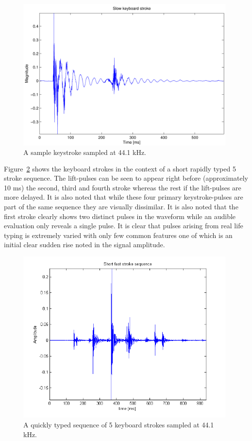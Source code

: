 \begin{figure}
  \begin{center}
    \includegraphics[width=110mm]{KeyboardStrokeSlowIntro.pdf}
    \caption{A sample keystroke sampled at 44.1 kHz.}\label{fig:KeyboardStrokeSlowIntro.pdf}
  \end{center}
\end{figure}

Figure~\ref{fig:shortFastSeq.png} shows the keyboard strokes in the context of a short rapidly typed 5 stroke sequence. The lift-pulses can be seen to appear right before (approximately 10 ms) the second, third and fourth stroke whereas the rest if the lift-pulses are more delayed. It is also noted that while these four primary keystroke-pulses are part of the same sequence they are visually dissimilar. It is also noted that the first stroke clearly shows two distinct pulses in the waveform while an audible evaluation only reveals a single pulse. It is clear that pulses arising from real life typing is extremely varied with only few common features one of which is an initial clear sudden rise noted in the signal amplitude.

\begin{figure}
  \begin{center}
    \includegraphics[width=110mm]{shortFastSeq.png}
    \caption{A quickly typed sequence of 5 keyboard strokes sampled at 44.1 kHz.}\label{fig:shortFastSeq.png}
  \end{center}
\end{figure}


